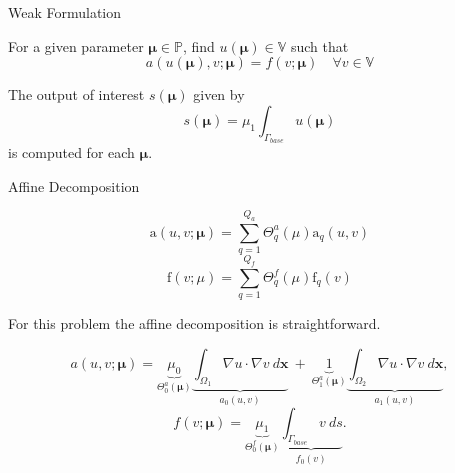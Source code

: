 \documentclass[9pt]{beamer}
\begin{document}
\begin{frame}{Weak Formulation}
\begin{exampleblock}{}
For a given parameter $\boldsymbol{\mu}\in\mathbb{P}$, find $u(\boldsymbol{\mu})\in\mathbb{V}$ such that
$$a\left(u(\boldsymbol{\mu}),v;\boldsymbol{\mu}\right)=f(v;\boldsymbol{\mu})\quad \forall v\in\mathbb{V}$$
\end{exampleblock}

\begin{alertblock}{}
The output of interest $s(\boldsymbol{\mu})$ given by
$$s(\boldsymbol{\mu}) = \mu_1\int_{\Gamma_{base}} u(\boldsymbol{\mu})$$
is computed for each $\boldsymbol{\mu}$.
\end{alertblock}
\end{frame}

\begin{frame}{Affine Decomposition}
    \begin{exampleblock}{}
        \begin{equation*}
            \mathrm{a}\left ({u},{v}; \mathbf{\mu} \right ) = \sum_{q=1}^{Q_a} \Theta_q^a (\mu) \mathrm{a}_q\left ({u},{v}\right )
        \end{equation*}
        \begin{equation*}
            \mathrm{f}\left(v;\mu \right) = \sum_{q=1}^{Q_f} \Theta_q^f (\mu) \mathrm{f}_q\left(v \right)
        \end{equation*}
    \end{exampleblock}
    For this problem the affine decomposition is straightforward.
    \begin{exampleblock}{}
        $$a(u,v;\boldsymbol{\mu})=\underbrace{\mu_0}_{\Theta^{a}_0(\boldsymbol{\mu})}\underbrace{\int_{\Omega_1}\nabla u \cdot \nabla v \ d\boldsymbol{x}}_{a_0(u,v)} \ + \  \underbrace{1}_{\Theta^{a}_1(\boldsymbol{\mu})}\underbrace{\int_{\Omega_2}\nabla u \cdot \nabla v \ d\boldsymbol{x}}_{a_1(u,v)},$$
$$f(v; \boldsymbol{\mu}) = \underbrace{\mu_1}_{\Theta^{f}_0(\boldsymbol{\mu})} \underbrace{\int_{\Gamma_{base}}v \ ds}_{f_0(v)}.$$
    \end{exampleblock}

\end{frame}
\end{document}
